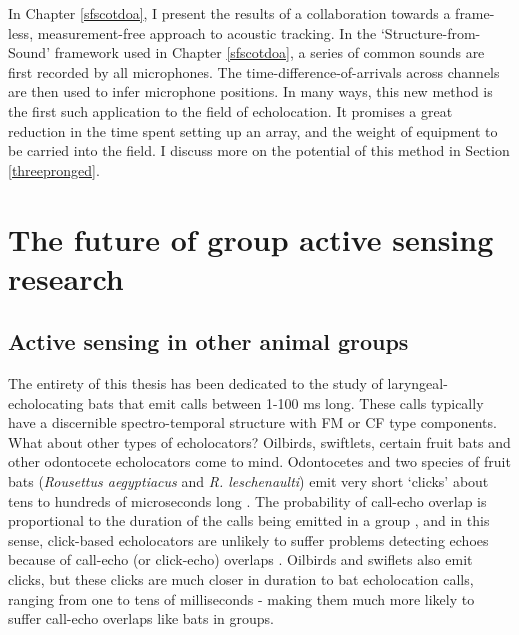 \documentclass[
]{book}
\begin{document}
In Chapter \ref{sfscotdoa}, I present the results of a collaboration towards a frame-less, measurement-free approach to acoustic tracking. In the `Structure-from-Sound' framework used in Chapter \ref{sfscotdoa}, a series of common sounds are first recorded by all microphones. The time-difference-of-arrivals across channels are then used to infer microphone positions. In many ways, this new method is the first such application to the field of echolocation. It promises a great reduction in the time spent setting up an array, and the weight of equipment to be carried into the field. I discuss more on the potential of this method in Section \ref{threepronged}.

\hypertarget{the-future-of-group-active-sensing-research}{%
\section{The future of group active sensing research}\label{the-future-of-group-active-sensing-research}}

\hypertarget{parametrising}{%
\subsection{Active sensing in other animal groups}\label{parametrising}}

The entirety of this thesis has been dedicated to the study of laryngeal-echolocating bats that emit calls between 1-100 ms long. These calls typically have a discernible spectro-temporal structure with FM or CF type components. What about other types of echolocators?
Oilbirds, swiftlets, certain fruit bats and other odontocete echolocators come to mind. Odontocetes and two species of fruit bats (\emph{Rousettus aegyptiacus} and \emph{R. leschenaulti}) emit very short `clicks' about tens to hundreds of microseconds long \citep{Fenton2014}. The probability of call-echo overlap is proportional to the duration of the calls being emitted in a group \citep{beleyur2019modeling}, and in this sense, click-based echolocators are unlikely to suffer problems detecting echoes because of call-echo (or click-echo) overlaps \citep{nelson2006a}. Oilbirds and swiflets also emit clicks, but these clicks are much closer in duration to bat echolocation calls, ranging from one to tens of milliseconds \citep{brinklov2013echolocation} - making them much more likely to suffer call-echo overlaps like bats in groups.
\end{document}
